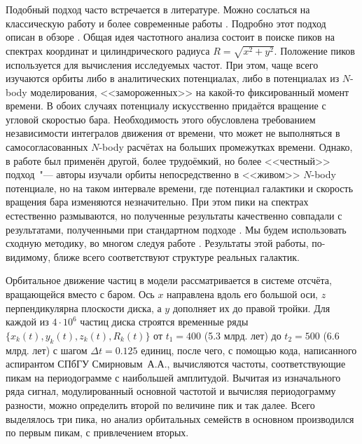 \documentclass{trlnotes}
\begin{document}
Подобный подход часто встречается в литературе. Можно сослаться на классическую работу \citet{binney1982} и более
современные работы  \citep{athanassoula2002,portail2015,valluri2016}. Подробно этот подход описан в обзоре
\citet{athanassoula2013}. Общая идея частотного анализа состоит в поиске пиков на спектрах координат и цилиндрического
радиуса $R = \sqrt{x^2 + y^2}$. Положение пиков используется для  вычисления исследуемых частот.  При этом, чаще всего
изучаются орбиты либо в аналитических потенциалах, либо в потенциалах из $N$-body моделирования, <<замороженных>> на
какой-то фиксированный момент времени. В обоих случаях потенциалу искусственно придаётся вращение с угловой скоростью
бара. Необходимость этого обусловлена требованием независимости интегралов движения от времени, что может не
выполняться в самосогласованных $N$-body расчётах на больших промежутках времени.  Однако, в
работе \citet{ceverino2007}
был применён другой, более трудоёмкий, но более <<честный>> подход~"--- авторы изучали орбиты непосредственно в
<<живом>> $N$-body потенциале, но на таком интервале времени, где потенциал галактики и скорость вращения бара
изменяются незначительно. При этом пики на спектрах естественно размываются, но полученные результаты качественно совпадали с результатами, полученными при стандартном подходе \citep{athanassoula2002a}.  Мы будем использовать сходную методику, во многом следуя работе \citet{gajda2016}. Результаты этой работы, по-видимому, ближе всего соответствуют структуре реальных галактик.

Орбитальное движение частиц в модели рассматривается в системе отсчёта, вращающейся вместо с баром. Ось $x$ направлена
вдоль его большой оси, $z$ перпендикулярна плоскости диска, а $y$ дополняет их до правой тройки.  Для каждой из $4\cdot
10^6$ частиц диска строятся временные ряды $\{x_k(t), y_k(t), z_k(t), R_k(t)\}$ от $t_1=400$ (5.3 млрд. лет) до
$t_2=500$ (6.6 млрд. лет) с шагом $Δt = 0.125$ единиц, после чего, с помощью кода, написанного аспирантом СПбГУ
Смирновым~А.А., вычисляются частоты, соответствующие пикам на периодограмме с наибольшей амплитудой. Вычитая из
изначального ряда сигнал, модулированный основной частотой и вычисляя периодограмму разности, можно определить второй по
величине пик и так далее. Всего выделялось три пика, но анализ орбитальных семейств в основном производился по первым
пикам, с привлечением вторых.
\end{document}
